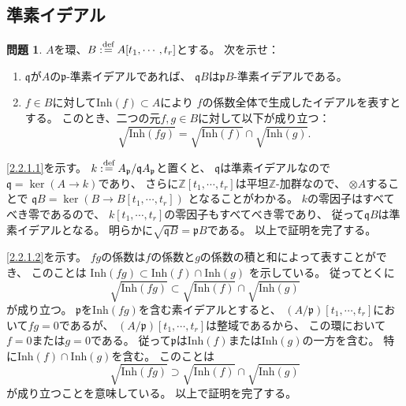 \documentclass[uplatex]{jsarticle}
\makeatletter
\theoremstyle{definition}
\newtheorem{prob}[prob]{問題}
\renewenvironment{proof}[1][\proofname]{
  \pushQED{\qed}%
  \normalfont \topsep6\p@\@plus6\p@\relax
  \trivlist
  \item[\hskip\labelsep
    #1\@addpunct{\textbf{.}}]\ignorespaces
}{%
  \popQED\endtrivlist\@endpefalse
}
\providecommand{\proofname}{証明}
\newcommand\Z{\mathbb{Z}}
\newcommand\mfp{\mathfrak{p}}
\newcommand\mfq{\mathfrak{q}}
\def\dfn{:\overset{\mbox{{\scriptsize def}}}{=}}
\makeatother
\begin{document}
\subsection{準素イデアル}

\begin{prob}\label{2.2.1}
  \(A\)を環、\(B\dfn A[t_1,\cdots, t_r]\)とする。
  次を示せ：
  \begin{enumerate}
    \item \label{2.2.1.1}
    \(\mfq\)が\(A\)の\(\mfp\)-準素イデアルであれば、
    \(\mfq B\)は\(\mfp B\)-準素イデアルである。
    \item \label{2.2.1.2}
    \(f\in B\)に対して\(\mathrm{Inh}(f)\subset A\)により
    \(f\)の係数全体で生成したイデアルを表すとする。
    このとき、二つの元\(f,g\in B\)に対して以下が成り立つ：
    \[\sqrt{\mathrm{Inh}(fg)} = \sqrt{\mathrm{Inh}(f)}\cap \sqrt{\mathrm{Inh}(g)}.\]
  \end{enumerate}
\end{prob}

\begin{proof}
  \ref{2.2.1.1}を示す。
  \(k\dfn A_{\mfp}/\mfq A_\mfp\)と置くと、
  \(\mfq\)は準素イデアルなので\(\mfq = \ker (A\to k)\)であり、
  さらに\(\Z[t_1,\cdots,t_r]\)は平坦\(\Z\)-加群なので、
  \(\otimes A\)することで
  \(\mfq B = \ker (B \to B[t_1,\cdots, t_r])\)
  となることがわかる。
  \(k\)の零因子はすべてべき零であるので、
  \(k[t_1,\cdots, t_r]\)の零因子もすべてべき零であり、
  従って\(\mfq B\)は準素イデアルとなる。
  明らかに\(\sqrt{\mfq B} = \mfp B\)である。
  以上で証明を完了する。

  \ref{2.2.1.2}を示す。
  \(fg\)の係数は\(f\)の係数と\(g\)の係数の積と和によって表すことができ、
  このことは
  \(\mathrm{Inh}(fg)\subset \mathrm{Inh}(f)\cap \mathrm{Inh}(g)\)
  を示している。
  従ってとくに
  \[
  \sqrt{\mathrm{Inh}(fg)} \subset \sqrt{\mathrm{Inh}(f)}\cap \sqrt{\mathrm{Inh}(g)}
  \]
  が成り立つ。
  \(\mfp\)を\(\mathrm{Inh}(fg)\)を含む素イデアルとすると、
  \((A/\mfp)[t_1,\cdots, t_r]\)において\(fg=0\)であるが、
  \((A/\mfp)[t_1,\cdots, t_r]\)は整域であるから、
  この環において\(f=0\)または\(g=0\)である。
  従って\(\mfp\)は\(\mathrm{Inh}(f)\)または\(\mathrm{Inh}(g)\)の一方を含む。
  特に\(\mathrm{Inh}(f)\cap \mathrm{Inh}(g)\)を含む。
  このことは
  \[
  \sqrt{\mathrm{Inh}(fg)} \supset \sqrt{\mathrm{Inh}(f)}\cap \sqrt{\mathrm{Inh}(g)}
  \]
  が成り立つことを意味している。
  以上で証明を完了する。
\end{proof}
\end{document}
